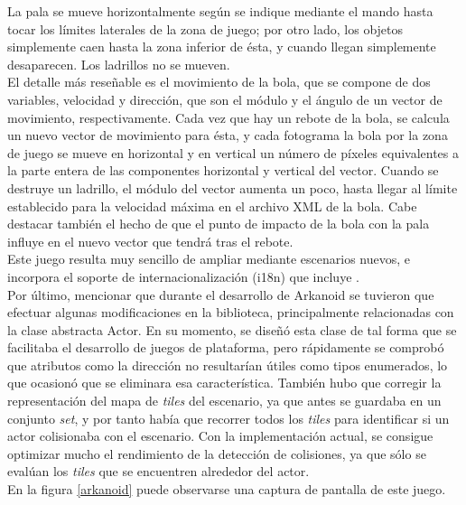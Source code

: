 La pala se mueve horizontalmente según se indique mediante el mando hasta tocar los límites laterales de la zona de juego; por otro lado, los objetos simplemente caen hasta la zona inferior de ésta, y cuando llegan simplemente desaparecen. Los ladrillos no se mueven.\\

El detalle más reseñable es el movimiento de la bola, que se compone de dos variables, velocidad y dirección, que son el módulo y el ángulo de un vector de movimiento, respectivamente. Cada vez que hay un rebote de la bola, se calcula un nuevo vector de movimiento para ésta, y cada fotograma la bola por la zona de juego se mueve en horizontal y en vertical un número de píxeles equivalentes a la parte entera de las componentes horizontal y vertical del vector. Cuando se destruye un ladrillo, el módulo del vector aumenta un poco, hasta llegar al límite establecido para la velocidad máxima en el archivo XML de la bola. Cabe destacar también el hecho de que el punto de impacto de la bola con la pala influye en el nuevo vector que tendrá tras el rebote.\\

Este juego resulta muy sencillo de ampliar mediante escenarios nuevos, e incorpora el soporte de internacionalización (i18n) que incluye .\\

Por último, mencionar que durante el desarrollo de Arkanoid se tuvieron que efectuar algunas modificaciones en la biblioteca, principalmente relacionadas con la clase abstracta Actor. En su momento, se diseñó esta clase de tal forma que se facilitaba el desarrollo de juegos de plataforma, pero rápidamente se comprobó que atributos como la dirección no resultarían útiles como tipos enumerados, lo que ocasionó que se eliminara esa característica. También hubo que corregir la representación del mapa de \emph{tiles} del escenario, ya que antes se guardaba en un conjunto \emph{set}, y por tanto había que recorrer todos los \emph{tiles} para identificar si un actor colisionaba con el escenario. Con la implementación actual, se consigue optimizar mucho el rendimiento de la detección de colisiones, ya que sólo se evalúan los \emph{tiles} que se encuentren alrededor del actor.\\

En la figura \ref{arkanoid} puede observarse una captura de pantalla de este juego.\\


